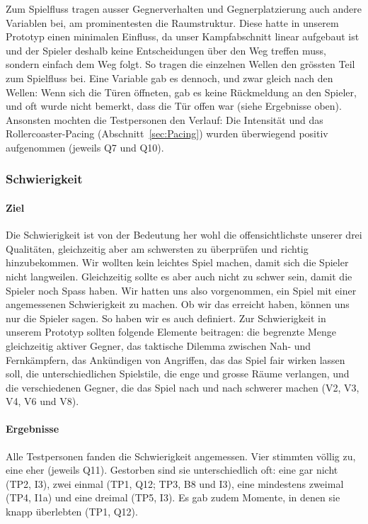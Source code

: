 \documentclass[../Main.tex]{subfiles}
\begin{document}
Zum Spielfluss tragen ausser Gegnerverhalten und Gegnerplatzierung auch andere Variablen bei, am prominentesten die Raumstruktur. Diese hatte in unserem Prototyp einen minimalen Einfluss, da unser Kampfabschnitt linear aufgebaut ist und der Spieler deshalb keine Entscheidungen über den Weg treffen muss, sondern einfach dem Weg folgt. So tragen die einzelnen Wellen den grössten Teil zum Spielfluss bei. Eine Variable gab es dennoch, und zwar gleich nach den Wellen: Wenn sich die Türen öffneten, gab es keine Rückmeldung an den Spieler, und oft wurde nicht bemerkt, dass die Tür offen war (siehe Ergebnisse oben). Ansonsten mochten die Testpersonen den Verlauf: Die Intensität und das Rollercoaster-Pacing (Abschnitt~\ref{sec:Pacing}) wurden überwiegend positiv aufgenommen (jeweils Q7 und Q10).

\subsubsection{Schwierigkeit}

\paragraph{Ziel}
Die Schwierigkeit ist von der Bedeutung her wohl die offensichtlichste unserer drei Qualitäten, gleichzeitig aber am schwersten zu überprüfen und richtig hinzubekommen. Wir wollten kein leichtes Spiel machen, damit sich die Spieler nicht langweilen. Gleichzeitig sollte es aber auch nicht zu schwer sein, damit die Spieler noch Spass haben. Wir hatten uns also vorgenommen, ein Spiel mit einer angemessenen Schwierigkeit zu machen. Ob wir das erreicht haben, können uns nur die Spieler sagen. So haben wir es auch definiert. Zur Schwierigkeit in unserem Prototyp sollten folgende Elemente beitragen: die begrenzte Menge gleichzeitig aktiver Gegner, das taktische Dilemma zwischen Nah- und Fernkämpfern, das Ankündigen von Angriffen, das das Spiel fair wirken lassen soll, die unterschiedlichen Spielstile, die enge und grosse Räume verlangen, und die verschiedenen Gegner, die das Spiel nach und nach schwerer machen (V2, V3, V4, V6 und V8).

\paragraph{Ergebnisse}
Alle Testpersonen fanden die Schwierigkeit angemessen. Vier stimmten völlig zu, eine eher (jeweils Q11). Gestorben sind sie unterschiedlich oft: eine gar nicht (TP2, I3), zwei einmal (TP1, Q12; TP3, B8 und I3), eine mindestens zweimal (TP4, I1a) und eine dreimal (TP5, I3). Es gab zudem Momente, in denen sie knapp überlebten (TP1, Q12).
\end{document}
